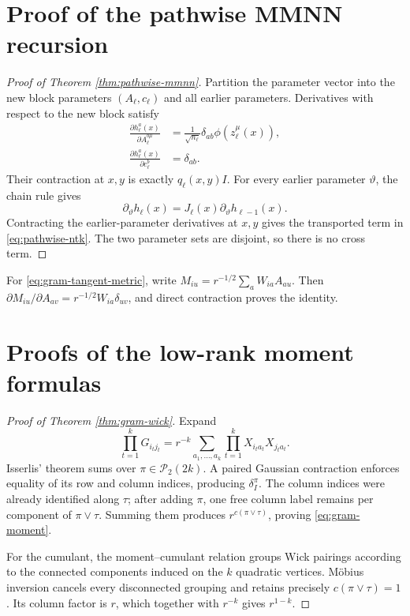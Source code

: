 \documentclass{article}
\newcommand{\cP}{\mathcal P}
\begin{document}
\clearpage
\appendix

\section{Proof of the pathwise MMNN recursion}
\label{app:pathwise}

\begin{proof}[Proof of Theorem \ref{thm:pathwise-mmnn}]
Partition the parameter vector into the new block parameters
\((A_\ell,c_\ell)\) and all earlier parameters.  Derivatives with respect to
the new block satisfy
\begin{align}
\frac{\partial h_\ell^a(x)}{\partial A_\ell^{b\mu}}
&=\frac1{\sqrt{n_\ell}}\delta_{ab}\phi(z_\ell^\mu(x)),\\
\frac{\partial h_\ell^a(x)}{\partial c_\ell^b}&=\delta_{ab}.
\end{align}
Their contraction at \(x,y\) is exactly \(q_\ell(x,y)I\).  For every earlier
parameter \(\vartheta\), the chain rule gives
\begin{equation}
\partial_\vartheta h_\ell(x)
=J_\ell(x)\partial_\vartheta h_{\ell-1}(x).
\end{equation}
Contracting the earlier-parameter derivatives at \(x,y\) gives the transported
term in \eqref{eq:pathwise-ntk}.  The two parameter sets are disjoint, so
there is no cross term.
\end{proof}

For \eqref{eq:gram-tangent-metric}, write
\(M_{iu}=r^{-1/2}\sum_aW_{ia}A_{au}\).  Then
\(\partial M_{iu}/\partial A_{av}=r^{-1/2}W_{ia}\delta_{uv}\), and direct
contraction proves the identity.

\section{Proofs of the low-rank moment formulas}
\label{app:rank-proofs}

\begin{proof}[Proof of Theorem \ref{thm:gram-wick}]
Expand
\begin{equation}
\prod_{t=1}^kG_{i_tj_t}
=r^{-k}\sum_{a_1,\ldots,a_k}
\prod_{t=1}^kX_{i_ta_t}X_{j_ta_t}.
\end{equation}
Isserlis' theorem sums over \(\pi\in\cP_2(2k)\).  A paired Gaussian
contraction enforces equality of its row and column indices, producing
\(\delta_I^\pi\).  The column indices were already identified along
\(\tau\); after adding \(\pi\), one free column label remains per component
of \(\pi\vee\tau\).  Summing them produces
\(r^{c(\pi\vee\tau)}\), proving \eqref{eq:gram-moment}.

For the cumulant, the moment--cumulant relation groups Wick pairings according
to the connected components induced on the \(k\) quadratic vertices.  M\"obius
inversion cancels every disconnected grouping and retains precisely
\(c(\pi\vee\tau)=1\).  Its column factor is \(r\), which together with
\(r^{-k}\) gives \(r^{1-k}\).
\end{proof}
\end{document}
